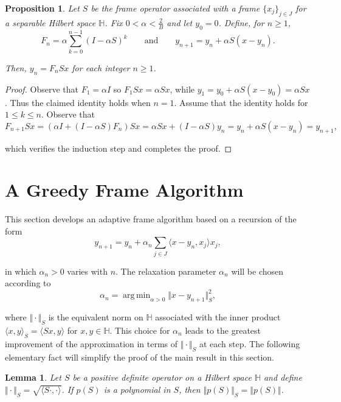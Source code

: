 \documentclass[11pt]{amsart}
\numberwithin{Theorem}{section}
\newtheorem*{proposition*}{Proposition}
\newtheorem*{lemma*}{Lemma}
\theoremstyle{definition}
\DeclareMathOperator*{\argmin}{arg\,min}
\begin{document}
\begin{proposition*}
Let $S$ be the frame operator associated with a frame $\lbrace x_{j} \rbrace_{j\in J}$ for a separable Hilbert space $\mathbb{H}$.  Fix $0<\alpha < \frac{2}{B}$ and let $y_{0}=0$.  Define, for $n\ge 1$,
$$ F_{n} = \alpha \sum_{k=0}^{n-1} (I-\alpha S)^{k}  \qquad \text{and} \qquad y_{n+1} = y_{n} + \alpha S(x-y_{n}). $$

\noindent
Then, $y_{n} = F_{n} Sx$ for each integer $n\ge 1$.
\end{proposition*}

\begin{proof}
Observe that $F_{1} =\alpha I$ so $F_{1} Sx = \alpha Sx$, while $y_{1} = y_{0} + \alpha S(x-y_{0}) = \alpha Sx$.  Thus the claimed identity holds when $n=1$.  Assume that the identity holds for $1\le k\le n$.  Observe that 
$$ F_{n+1} S x = \left ( \alpha I + (I-\alpha S) F_{n} \right ) Sx = \alpha Sx + (I-\alpha S) y_{n} = y_{n} + \alpha S(x-y_{n}) = y_{n+1},$$

\noindent
which verifies the induction step and completes the proof.
\end{proof}


\section{A Greedy Frame Algorithm} \label{section:3}

This section develops an adaptive frame algorithm based on a recursion of the form
$$ y_{n+1} = y_{n} + \alpha_{n} \sum_{j\in J} \langle x-y_{n}, x_{j} \rangle x_{j}, $$

\noindent
in which $\alpha_{n}>0$ varies with $n$.  The relaxation parameter $\alpha_{n}$ will be chosen according to
$$ \alpha_{n} = \argmin_{\alpha > 0} \Vert x-y_{n+1} \Vert_{S}^{2}, $$

\noindent
where $\Vert \cdot\Vert_{S}$ is the equivalent norm on $\mathbb{H}$ associated with the inner product $ \langle x, y \rangle_{S} = \langle Sx, y \rangle$ for $x,y\in \mathbb{H}$.  This choice for $\alpha_{n}$ leads to the greatest improvement of the approximation in terms of $\Vert \cdot \Vert_{S}$ at each step.  The following elementary fact will simplify the proof of the main result in this section.

\begin{lemma*} %
Let $S$ be a positive definite operator on a Hilbert space $\mathbb{H}$ and define $\Vert \cdot \Vert_{S} = \sqrt{\langle S\cdot, \cdot \rangle}$.  If $p(S)$ is a polynomial in $S$, then $\Vert p(S)\Vert_{S} = \Vert p(S)\Vert$.
\end{lemma*}
\end{document}
